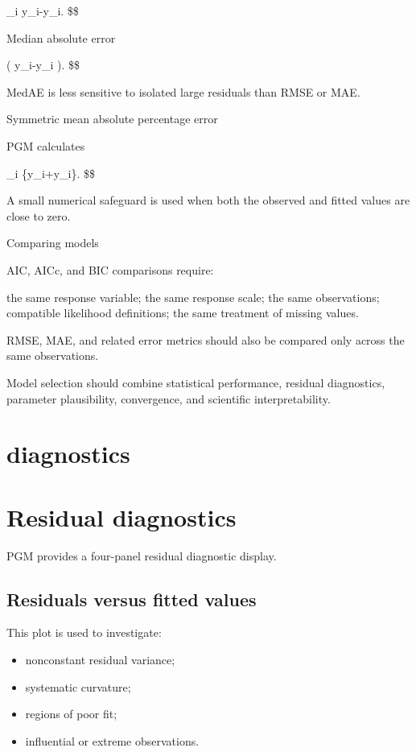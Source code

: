 \documentclass[
  english,
  letterpaper,
  DIV=11,
  numbers=noendperiod]{scrreprt}
\providecommand{\tightlist}{%
  \setlength{\itemsep}{0pt}\setlength{\parskip}{0pt}}
\begin{document}

\sum\_i \textbar y\_i-\hat y\_i\textbar. \$\$

Median absolute error


\left( \textbar y\_i-\hat y\_i\textbar{} \right). \$\$

MedAE is less sensitive to isolated large residuals than RMSE or MAE.

Symmetric mean absolute percentage error

PGM calculates


\sum\_i 
\{\textbar y\_i\textbar+\textbar{}\hat y\_i\textbar\}. \$\$

A small numerical safeguard is used when both the observed and fitted
values are close to zero.

Comparing models

AIC, AICc, and BIC comparisons require:

the same response variable; the same response scale; the same
observations; compatible likelihood definitions; the same treatment of
missing values.

RMSE, MAE, and related error metrics should also be compared only across
the same observations.

Model selection should combine statistical performance, residual
diagnostics, parameter plausibility, convergence, and scientific
interpretability.

\chapter{diagnostics}\label{diagnostics}

\chapter{Residual diagnostics}\label{residual-diagnostics}

PGM provides a four-panel residual diagnostic display.

\section{Residuals versus fitted
values}\label{residuals-versus-fitted-values}

This plot is used to investigate:

\begin{itemize}
\tightlist
\item
  nonconstant residual variance;
\item
  systematic curvature;
\item
  regions of poor fit;
\item
  influential or extreme observations.
\end{itemize}
\end{document}
